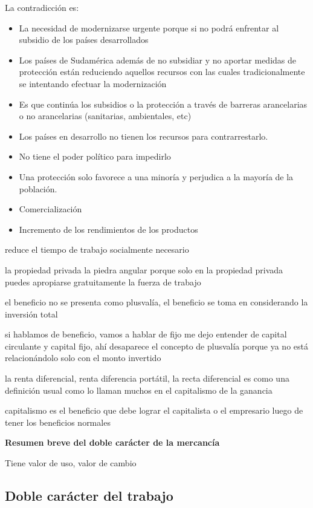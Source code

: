 \documentclass[
  letterpaper,
  DIV=11,
  numbers=noendperiod]{scrartcl}
\providecommand{\tightlist}{%
  \setlength{\itemsep}{0pt}\setlength{\parskip}{0pt}}\usepackage{longtable,booktabs,array}
\begin{document}
La contradicción es:

\begin{itemize}
\tightlist
\item
  La necesidad de modernizarse urgente porque si no podrá enfrentar al
  subsidio de los países desarrollados
\item
  Los países de Sudamérica además de no subsidiar y no aportar medidas
  de protección están reduciendo aquellos recursos con las cuales
  tradicionalmente se intentando efectuar la modernización
\item
  Es que continúa los subsidios o la protección a través de barreras
  arancelarias o no arancelarias (sanitarias, ambientales, etc)
\item
  Los países en desarrollo no tienen los recursos para contrarrestarlo.
\item
  No tiene el poder político para impedirlo
\item
  Una protección solo favorece a una minoría y perjudica a la mayoría de
  la población.
\item
  Comercialización
\item
  Incremento de los rendimientos de los productos
\end{itemize}

reduce el tiempo de trabajo socialmente necesario

la propiedad privada la piedra angular porque solo en la propiedad
privada puedes apropiarse gratuitamente la fuerza de trabajo

el beneficio no se presenta como plusvalía, el beneficio se toma en
considerando la inversión total

si hablamos de beneficio, vamos a hablar de fijo me dejo entender de
capital circulante y capital fijo, ahí desaparece el concepto de
plusvalía porque ya no está relacionándolo solo con el monto invertido

la renta diferencial, renta diferencia portátil, la recta diferencial es
como una definición usual como lo llaman muchos en el capitalismo de la
ganancia

capitalismo es el beneficio que debe lograr el capitalista o el
empresario luego de tener los beneficios normales

\textbf{Resumen breve del doble carácter de la mercancía}

Tiene valor de uso, valor de cambio

\hypertarget{doble-caruxe1cter-del-trabajo}{%
\subsection{Doble carácter del
trabajo}\label{doble-caruxe1cter-del-trabajo}}
\end{document}
